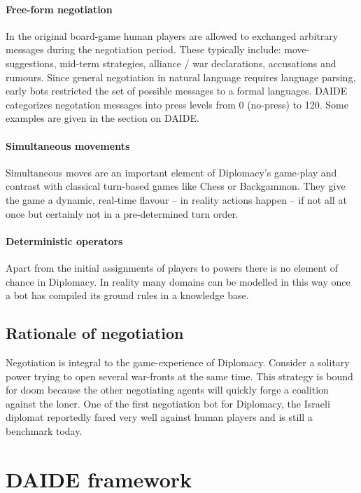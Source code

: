 \documentclass[pdftex,12pt,a4paper]{report}
\begin{document}
\paragraph{Free-form negotiation}
In the original board-game human players are allowed to exchanged
arbitrary messages during the negotiation period. These typically
include: move-suggestions, mid-term strategies, alliance / war
declarations, accusations and rumours. Since general negotiation
in natural language requires language parsing, early 
bots \cite{Kraus92} restricted the set of possible messages to 
a formal languages. DAIDE categorizes negotation messages 
into press levels \cite{DAIDEsyntax10} from 0 (no-press) to 120.
Some examples are given in the section on DAIDE.

\paragraph{Simultaneous movements} 
Simultaneous moves are an important element of Diplomacy's game-play
and contrast with classical turn-based games like Chess or
Backgammon. They give the game a dynamic, real-time flavour -- in
reality actions happen -- if not all at once but certainly not in a
pre-determined turn order.

\paragraph{Deterministic operators}
Apart from the initial assignments of players to powers there is no
element of chance in Diplomacy. In reality many domains can be
modelled in this way once a bot has compiled its ground rules in a
knowledge base.

\subsection{Rationale of negotiation}

Negotiation is integral to the game-experience of Diplomacy. Consider
a solitary power trying to open several war-fronts at the same
time. This strategy is bound for doom because the other negotiating
agents will quickly forge a coalition against the loner. One of the
first negotiation bot for Diplomacy, the Israeli diplomat \cite{Kraus89}
reportedly fared very well against human players and is still a 
benchmark today.

\pagebreak

\section{DAIDE framework}
\end{document}
